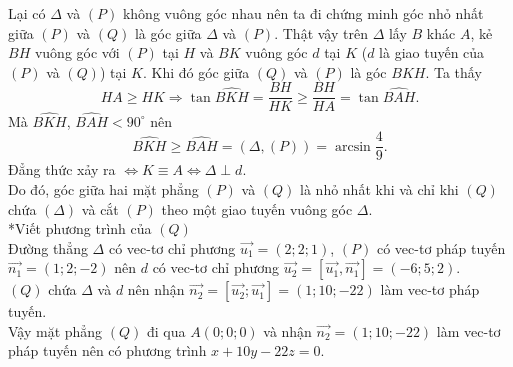 \begin{ex}
{		Lại có $\Delta$ và $(P)$ không vuông góc nhau nên ta đi chứng minh góc nhỏ nhất giữa $(P)$ và $(Q)$ là góc giữa $\Delta$ và $(P)$. Thật vậy trên $\Delta$ lấy $B$ khác $A$, kẻ $BH$ vuông góc với $(P)$ tại $H$ và $B K$ vuông góc $d$ tại $K$ ($d$ là giao tuyến của $(P)$ và $(Q)$) tại $K$. Khi đó góc giữa $(Q)$ và $(P)$ là góc $BKH$.
		Ta thấy
		$$
		HA \geq HK 
		\Rightarrow 
		\tan \widehat{BKH}=\dfrac{BH}{HK}
		\geq
		\dfrac{BH}{HA}=\tan \widehat{BAH}.
		$$
		Mà $\widehat{BKH}$, $\widehat{BAH}<90^{\circ}$ nên
		$$
		\widehat{BKH} \geq \widehat{BAH}=(\Delta,(P))=\arcsin \dfrac{4}{9}.
		$$
		Đẳng thức xảy ra $\Leftrightarrow K \equiv A \Leftrightarrow \Delta \perp d$.
		\\
		Do đó, góc giữa hai mặt phẳng $(P)$ và $(Q)$ là nhỏ nhất khi và chỉ khi $(Q)$ chứa $(\Delta)$ và cắt $(P)$ theo một giao tuyến vuông góc $\Delta$.
		\\
		*Viết phương trình của $(Q)$
		\\
		Đường thẳng $\Delta$ có vec-tơ chỉ phương $\vec{u_1}=(2 ; 2 ; 1)$, $(P)$ có vec-tơ pháp tuyến $\vec{n_1}=(1 ; 2 ;-2)$ nên $d$ có vec-tơ chỉ phương $\vec{u_2}=\left[\vec{u_1}, \vec{n_1}\right]=(-6 ; 5 ; 2)$.
		\\
		$(Q)$ chứa $\Delta$ và $d$ nên nhận $\vec{n_2}=\left[\vec{u_2} ; \vec{u_1}\right]=(1 ; 10 ;-22)$ làm vec-tơ pháp tuyến.
		\\
		Vậy mặt phẳng $(Q)$ đi qua $A(0 ; 0 ; 0)$ và nhận $\vec{n_2}=(1 ; 10 ;-22)$ làm vec-tơ pháp tuyến nên có phương trình $x+10 y-22 z=0$.
	}
\end{ex}

